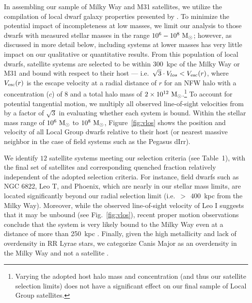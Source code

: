 In assembling our sample of Milky Way and M31 satellites, we utilize
the compilation of local dwarf galaxy properties presented by
\citet{mcconnachie12}. To minimize the potential impact of
incompleteness at low masses, we limit our analysis to those dwarfs
with measured stellar masses in the range $10^{6}-10^{8}~{\rm M}_{\odot}$;
however, as discussed in more detail below, including systems at lower
masses has very little impact on our qualitative or quantitative
results. From this population of local dwarfs, satellite systems are
selected to be within $300$~kpc of the Milky Way or M31 and bound with
respect to their host --- i.e.~$\sqrt{3} \cdot V_{los} < V_{\rm
  esc}(r)$, where $V_{\rm esc}(r)$ is the escape velocity at a radial
distance of $r$ for an NFW halo with a concentration ($c$) of $8$ and
a total halo mass of $2\times 10^{12}\ \rm {\rm M}_{\odot}$.\footnote{Varying
  the adopted host halo mass and concentration (and thus our satellite
  selection limits) does not have a significant effect on our final
  sample of Local Group satellites.} To account for potential
tangential motion, we multiply all observed line-of-sight velocities
from \citet{mcconnachie12} by a factor of $\sqrt{3}$ in evaluating
whether each system is bound. Within the stellar mass range of
$10^{6}~{\rm M}_{\odot}$ to $10^{8}~{\rm M}_{\odot}$, Figure~\ref{fig:vlos} shows the
position and velocity of all Local Group dwarfs relative to their host
(or nearest massive neighbor in the case of field systems such as the
Pegasus dIrr).


We identify $12$ satellite systems meeting our selection criteria (see
Table~1), with the final set of satellites and
corresponding quenched fraction relatively independent of the adopted
selection criteria. For instance, field dwarfs such as NGC 6822, Leo
T, and Phoenix, which are nearly in our stellar mass limits, are
located significantly beyond our radial selection limit
(i.e.~$>~\!\!\!~400$~kpc from the Milky Way). Moreover, while the
observed line-of-sight velocity of Leo I suggests that it may be
unbound (see Fig.~\ref{fig:vlos}), recent proper motion observations
conclude that the system is very likely bound to the Milky Way even at
a distance of more than 250~kpc \citep{sohn13, bk13}. Finally, given
the high metallicity and lack of overdensity in RR Lyrae stars, we
categorize Canis Major as an overdensity in the Milky Way and not a
satellite \citep[][but see also \citealt{md05}]{momany04, butler07,
  mateu09}.



